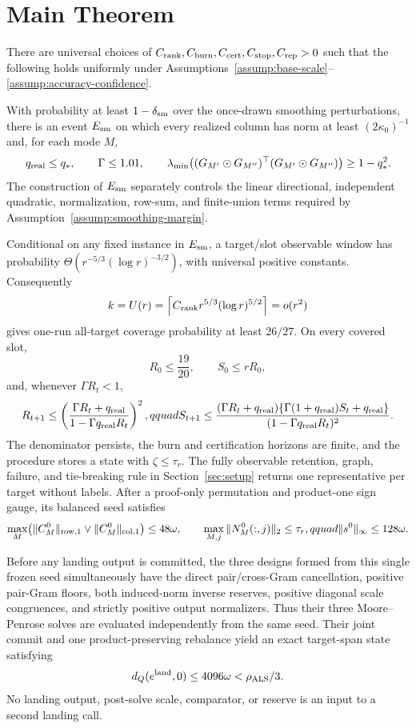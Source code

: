 \section{Main Theorem}\label{sec:main}

\begin{theorem}
\label{thm:main}
There are universal choices of
$C_{\rm rank},C_{\rm burn},C_{\rm cert},C_{\rm stop},C_{\rm rep}>0$ such
that the following holds uniformly under
Assumptions~\ref{assump:base-scale}--\ref{assump:accuracy-confidence}.

With probability at least $1-\delta_{\rm sm}$ over the once-drawn smoothing
perturbations, there is an event $E_{\rm sm}$ on which every realized column
has norm at least $(2\kappa _0)^{-1}$ and, for each mode $M$,
\[
 q_{\rm real}\le q_*,\qquad \Gamma\le1.01,\qquad
 \lambda_{\min}\!\left((G_{M'}\odot G_{M''})^\top
 (G_{M'}\odot G_{M''})\right)\ge1-q_*^2.
\]
The construction of $E_{\rm sm}$ separately controls the linear directional,
independent quadratic, normalization, row-sum, and finite-union terms required
by Assumption~\ref{assump:smoothing-margin}.

Conditional on any fixed instance in $E_{\rm sm}$, a target/slot observable
window has probability
$\Theta(r^{-5/3}(\log r)^{-3/2})$, with universal positive constants.
Consequently
\[
 k=U(r)=\left\lceil C_{\rm rank}r^{5/3}(\log r)^{5/2}\right\rceil=o(r^2)
\]
gives one-run all-target coverage probability at least $26/27$. On every
covered slot,
\[
 R_0\le\frac{19}{20},\qquad S_0\le rR_0,
\]
and, whenever $\Gamma R_t<1$,
\[
 R_{t+1}\le\left(\frac{\Gamma R_t+q_{\rm real}}
 {1-\Gamma q_{\rm real}R_t}\right)^2,qquad
 S_{t+1}\le
 \frac{(\Gamma R_t+q_{\rm real})
 \{\Gamma(1+q_{\rm real})S_t+q_{\rm real}\}}
 {(1-\Gamma q_{\rm real}R_t)^2}.
\]
The denominator persists, the burn and certification horizons are finite,
and the procedure stores a state with $\zeta\le\tau_r$. The fully observable
retention, graph, failure, and tie-breaking rule in
Section~\ref{sec:setup} returns one representative per target without labels.
After a proof-only permutation and product-one sign gauge, its balanced seed
satisfies
\[
 \max_M\bigl(\|C_M^0\|_{\rm row,1}\vee\|C_M^0\|_{\rm col,1}\bigr)
 \le48\omega,\qquad
 \max_{M,j}\|N_M^0(:,j)\|_2\le\tau_r,qquad
 \|s^0\|_\infty\le128\omega.
\]

Before any landing output is committed, the three designs formed from this
single frozen seed simultaneously have the direct pair/cross-Gram
cancellation, positive pair-Gram floors, both induced-norm inverse reserves,
positive diagonal scale congruences, and strictly positive output normalizers.
Thus their three Moore--Penrose solves are evaluated independently from the
same seed. Their joint commit and one product-preserving rebalance yield an
exact target-span state satisfying
\[
 d_Q(e^{\rm land},0)\le4096\omega<\rho_{\rm ALS}/3.
\]
No landing output, post-solve scale, comparator, or reserve is an input to a
second landing call.


\end{theorem}
